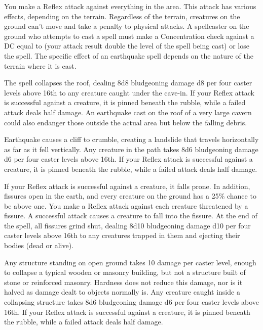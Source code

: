 \spellrng{\rngfar}
\begin{spelleffect}
    You make a Reflex attack against everything in the area. This attack has various effects, depending on the terrain. Regardless of the terrain, creatures on the ground can't move and take a  penalty to physical attacks. A spellcaster on the ground who attempts to cast a spell must make a Concentration check against a DC equal to (your attack result \add double the level of the spell being cast) or lose the spell. The specific effect of an earthquake spell depends on the nature of the terrain where it is cast.
  \par {} The spell collapses the roof, dealing 8d8 bludgeoning damage \add d8 per four caster levels above 16th to any creature caught under the cave-in. If your Reflex attack is successful against a creature, it is pinned beneath the rubble, while a failed attack deals half damage. An earthquake cast on the roof of a very large cavern could also endanger those outside the actual area but below the falling debris.
  \par {} Earthquake causes a cliff to crumble, creating a landslide that travels horizontally as far as it fell vertically. Any creature in the path takes 8d6 bludgeoning damage \add d6 per four caster levels above 16th. If your Reflex attack is successful against a creature, it is pinned beneath the rubble, while a failed attack deals half damage.
  \par {} If your Reflex attack is successful against a creature, it falls prone. In addition, fissures open in the earth, and every creature on the ground has a 25\% chance to be above one. You make a Reflex attack against each creature threatened by a fissure. A successful attack causes a creature to fall into the fissure. At the end of the spell, all fissures grind shut, dealing 8d10 bludgeoning damage \add d10 per four caster levels above 16th to any creatures trapped in them and ejecting their bodies (dead or alive).
  \par {} Any structure standing on open ground takes 10 damage per caster level, enough to collapse a typical wooden or masonry building, but not a structure built of stone or reinforced masonry. Hardness does not reduce this damage, nor is it halved as damage dealt to objects normally is. Any creature caught inside a collapsing structure takes 8d6 bludgeoning damage \add d6 per four caster levels above 16th. If your Reflex attack is successful against a creature, it is pinned beneath the rubble, while a failed attack deals half damage.

\end{spelleffect}
